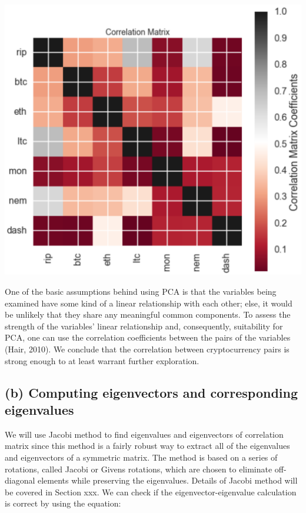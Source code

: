 \documentclass[12pt,twoside]{article}
\begin{document}
\bigbreak

\includegraphics[scale=.7]{corr.png}

\bigbreak

One of the basic assumptions behind using PCA is that the variables being examined have some kind of a linear relationship with each other; else, it would be unlikely that they share any meaningful common components. To assess the strength of the variables’ linear relationship and, consequently, suitability for PCA, one can use the correlation coefficients between the pairs of the variables (Hair, 2010). We conclude that the correlation between cryptocurrency pairs is strong enough to at least warrant further exploration.

\subsection*{(b) Computing eigenvectors and corresponding eigenvalues}
\bigbreak
We will use Jacobi method to find eigenvalues and eigenvectors of correlation matrix since this method is a fairly robust way to extract all of the eigenvalues and eigenvectors of a symmetric matrix. The method is based on a series of rotations, called Jacobi or Givens rotations, which are chosen to eliminate off-diagonal elements while preserving the eigenvalues. Details of Jacobi method will be covered in Section xxx.
\bigbreak
We can check if the eigenvector-eigenvalue calculation is correct by using the equation:
\end{document}
